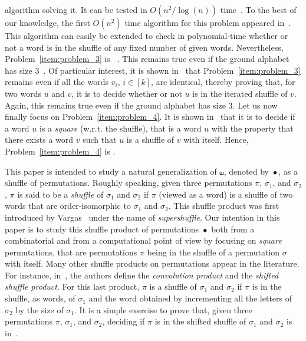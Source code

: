 \documentclass[a4paper]{llncs}
\DeclareMathOperator{\SHUFFLE}{\bullet}
\begin{document}
algorithm solving it. It can be tested in $O\left(n^2 / \log(n)\right)$
time~\cite{Leeuwen:Nivat:IPL:1982}. To the best of our knowledge, the
first $O(n^2)$ time algorithm for this problem appeared
in~\cite{Mansfield:DAM:1983}. This algorithm can easily be extended to
check in polynomial-time whether or not a word is in the shuffle of any
fixed number of given words. Nevertheless, Problem~\ref{item:problem_3}
is \NPC~\cite{Mansfield:DAM:1983,Warmuth:Haussler:JCSS:1984}. This
remains true even if the ground alphabet has size
$3$~\cite{Warmuth:Haussler:JCSS:1984}. Of particular interest,
it is shown in~\cite{Warmuth:Haussler:JCSS:1984} that
Problem~\ref{item:problem_3} remains \NPC even if all the words $v_i$,
$i \in [k]$, are identical, thereby proving that, for two words $u$ and
$v$, it is \NPC to decide whether or not $u$ is in the iterated shuffle
of $v$. Again, this remains true even if the ground alphabet has size $3$.
Let us now finally focus on Problem~\ref{item:problem_4}. It is shown
in~\cite{Buss:Soltys:2014,Rizzi:Vialette:CSR:2013} that it is \NPC to
decide if a word $u$ is a \emph{square} (w.r.t. the shuffle), that is
a word $u$ with the property that there exists a word $v$ such that $u$
is a shuffle of $v$ with itself. Hence, Problem~\ref{item:problem_4}
is \NPC.
\smallskip

This paper is intended to study a natural generalization of $\shuffle$,
denoted by $\SHUFFLE$, as a shuffle of permutations. Roughly speaking,
given three permutations $\pi$, $\sigma_1$, and $\sigma_2$, $\pi$ is
said to be a {\em shuffle} of $\sigma_1$ and $\sigma_2$ if $\pi$ (viewed
as a word) is a shuffle of two words that are order-isomorphic to
$\sigma_1$ and $\sigma_2$. This shuffle product was first introduced by
Vargas~\cite{Vargas:2014} under the name of {\em supershuffle}. Our
intention in this paper is to study this shuffle product of permutations
$\SHUFFLE$ both from a combinatorial and from a computational point of
view by focusing on {\em square} permutations, that are permutations
$\pi$ being in the shuffle of a permutation $\sigma$ with itself. Many
other shuffle products on permutations appear in the literature. For
instance, in~\cite{DHT:IJAC:2002}, the authors define the {\em convolution
product} and the {\em shifted shuffle product}. For this last product,
$\pi$ is a shuffle of $\sigma_1$ and $\sigma_2$ if $\pi$ is in the shuffle,
as words, of $\sigma_1$ and the word obtained by incrementing all the
letters of $\sigma_2$ by the size of $\sigma_1$. It is a simple exercise
to prove that, given three permutations $\pi$, $\sigma_1$, and $\sigma_2$,
deciding if $\pi$ is in the shifted shuffle of $\sigma_1$ and $\sigma_2$
is in~\Pclass.
\smallskip
\end{document}
